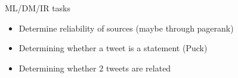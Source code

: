 ML/DM/IR tasks


\begin{itemize}
    \item Determine reliability of sources (maybe through pagerank)
    \item Determining whether a tweet is a statement (Puck)
    \item Determining whether 2 tweets are related
\end{itemize}